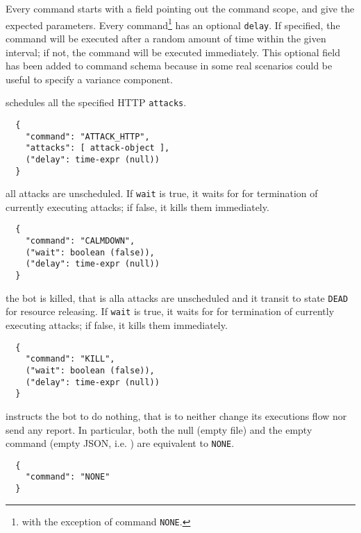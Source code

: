 Every command starts with a field pointing out the command scope, and give the expected parameters.
Every command\footnote{with the exception of command \texttt{NONE}.} has an optional \texttt{delay}. If specified, the command will be executed after a random amount of time within the given interval; if not, the command will be executed immediately. This optional field has been added to command schema because in some real scenarios could be useful to specify a variance component.

\begin{description}
  \setlength\itemsep{1em}

  \item[ATTACK-HTTP] schedules all the specified HTTP \texttt{attacks}.

  \begin{verbatim}
  {
    "command": "ATTACK_HTTP",
    "attacks": [ attack-object ],
    ("delay": time-expr (null))
  }
  \end{verbatim}

  \item[CALMDOWN] all attacks are unscheduled.
  If \texttt{wait} is true, it waits for for termination of currently executing attacks; if false, it kills them immediately.

  \begin{verbatim}
  {
    "command": "CALMDOWN",
    ("wait": boolean (false)),
    ("delay": time-expr (null))
  }
  \end{verbatim}

  \item[KILL] the bot is killed, that is alla attacks are unscheduled and it transit to state \texttt{DEAD} for resource releasing.
  If \texttt{wait} is true, it waits for for termination of currently executing attacks; if false, it kills them immediately.

  \begin{verbatim}
  {
    "command": "KILL",
    ("wait": boolean (false)),
    ("delay": time-expr (null))
  }
  \end{verbatim}

  \item[NONE] instructs the bot to do nothing, that is to neither change its executions flow nor send any report. In particular, both the null (empty file) and the empty command (empty JSON, i.e. {}) are equivalent to \texttt{NONE}.

  \begin{verbatim}
  {
    "command": "NONE"
  }
  \end{verbatim}


\end{description}
